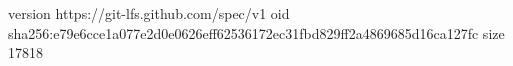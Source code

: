 version https://git-lfs.github.com/spec/v1
oid sha256:e79e6cce1a077e2d0e0626eff62536172ec31fbd829ff2a4869685d16ca127fc
size 17818
